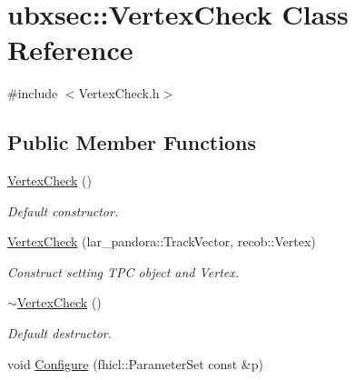 \hypertarget{classubxsec_1_1VertexCheck}{\section{ubxsec\-:\-:\-Vertex\-Check \-Class \-Reference}
\label{classubxsec_1_1VertexCheck}
}


{\ttfamily \#include $<$\-Vertex\-Check.\-h$>$}

\subsection*{\-Public \-Member \-Functions}
\begin{DoxyCompactItemize}
\item 
\hypertarget{classubxsec_1_1VertexCheck_af6ef46e3fc198a067987f64ef863aa45}{\hyperlink{classubxsec_1_1VertexCheck_af6ef46e3fc198a067987f64ef863aa45}{\-Vertex\-Check} ()}\label{classubxsec_1_1VertexCheck_af6ef46e3fc198a067987f64ef863aa45}

\begin{DoxyCompactList}\small\item\em \-Default constructor. \end{DoxyCompactList}\item 
\hypertarget{classubxsec_1_1VertexCheck_af1d0f2f6c434db12aee3c8ae4b810da8}{\hyperlink{classubxsec_1_1VertexCheck_af1d0f2f6c434db12aee3c8ae4b810da8}{\-Vertex\-Check} (lar\-\_\-pandora\-::\-Track\-Vector, recob\-::\-Vertex)}\label{classubxsec_1_1VertexCheck_af1d0f2f6c434db12aee3c8ae4b810da8}

\begin{DoxyCompactList}\small\item\em \-Construct setting \-T\-P\-C object and \-Vertex. \end{DoxyCompactList}\item 
\hypertarget{classubxsec_1_1VertexCheck_a31f02bd272b70d96d3e20be2519c5b74}{\hyperlink{classubxsec_1_1VertexCheck_a31f02bd272b70d96d3e20be2519c5b74}{$\sim$\-Vertex\-Check} ()}\label{classubxsec_1_1VertexCheck_a31f02bd272b70d96d3e20be2519c5b74}

\begin{DoxyCompactList}\small\item\em \-Default destructor. \end{DoxyCompactList}\item 
\hypertarget{classubxsec_1_1VertexCheck_aa2b80d7c8c6eb06d53d44f5ea2810b22}{void \hyperlink{classubxsec_1_1VertexCheck_aa2b80d7c8c6eb06d53d44f5ea2810b22}{\-Configure} (fhicl\-::\-Parameter\-Set const \&p)}\label{classubxsec_1_1VertexCheck_aa2b80d7c8c6eb06d53d44f5ea2810b22}


\end{DoxyCompactItemize}
